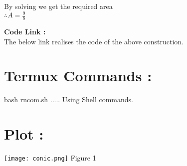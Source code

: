 \documentclass[10pt,a4paper]{report}
\begin{document}
\begin{multicols}{2}
\centering By solving we get the required area\\
$\therefore A = \frac{9}{8}$ 

\raggedright \textbf{Code Link :}\\ \vspace{2mm}
The below link realises the code of the above construction.\\
\begin{center}
\end{center}


\section{Termux Commands :}
\centering bash rncom.sh ..... Using Shell commands.


\section{Plot :} 
\begin{center}
  \texttt{[image: conic.png]}
  Figure 1
  	\end{center}

 
\end{multicols}
\end{document}
